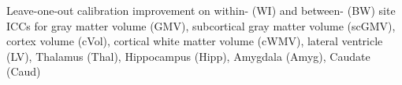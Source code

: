 \label{fig:calib} Leave-one-out calibration improvement on within- (WI) and between- (BW) site ICCs for gray matter volume (GMV), subcortical gray matter volume (scGMV), cortex volume (cVol), cortical white matter volume (cWMV), lateral ventricle (LV), Thalamus (Thal), Hippocampus (Hipp), Amygdala (Amyg), Caudate (Caud) 